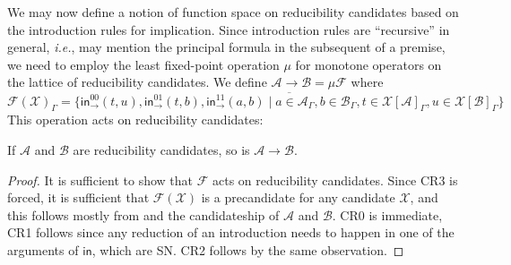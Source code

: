\documentclass[a4paper,USenglish,cleveref, autoref, thm-restate]{lipics-v2019}
\newcommand{\ie}{\emph{i.e.}\xspace}
\newcommand{\tin}{\ensuremath{\mathsf{in}}}
\newcommand{\inn}[2]{\tin_{#1}^{#2}}
\newcommand{\cl}[1]{\overline{#1}}
\newcommand{\A}{\mathcal{A}}
\newcommand{\B}{\mathcal{B}}
\newcommand{\F}{\mathcal{F}}
\newcommand{\X}{\mathcal{X}}
\begin{document}
We may now define a notion of function space on reducibility
candidates based on the introduction rules for implication.  Since
introduction rules are ``recursive'' in general, \ie, may mention the
principal formula in the subsequent of a premise, we need to employ
the least fixed-point operation $\mu$ for monotone operators on the
lattice of reducibility candidates.
We define $\A \to \B = \mu\F$ where
\[
  \F(\X)_\Gamma =
  \cl{\{
    \inn\to{00}(t,u),
    \inn\to{01}(t,b),
    \inn\to{11}(a,b) \mid
      a \in \A_\Gamma,
      b \in \B_\Gamma,
      t \in \X[\A]_\Gamma,
      u \in \X[\B]_\Gamma
  \}}
\]
This operation acts on reducibility candidates:
\begin{lemma}
  \label{lem:fun}
  If $\A$ and $\B$ are reducibility candidates, so is $\A \to \B$.
\end{lemma}
\begin{proof}
  It is sufficient to show that $\F$ acts on reducibility candidates.
  Since CR3 is forced, it is sufficient that $\F(\X)$ is a
  precandidate for any candidate $\X$, and this follows mostly from
   and the candidateship of $\A$ and $\B$.
  CR0 is immediate, CR1 follows since any reduction of an introduction
  needs to happen in one of the arguments of $\tin$, which are SN.
  CR2 follows by the same observation.
\end{proof}
\end{document}
